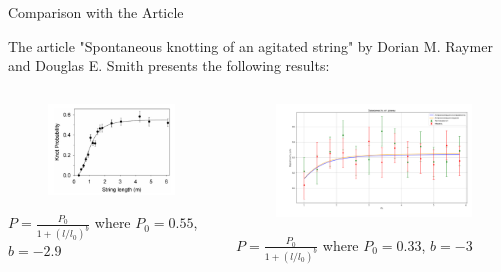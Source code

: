 \begin{frame}{Comparison with the Article}
\begin{block}{}
The article "Spontaneous knotting of an agitated string" by Dorian M. Raymer and Douglas E. Smith presents the following results:
\end{block}

\begin{columns}
\begin{column}{0.4\linewidth}
\begin{figure}[H]
\includegraphics[width=1\linewidth]{img/knot_prob.png}
\end{figure}
$P = \frac{P_0}{1+(l/l_0)^b}$
where $P_0 = 0.55$, $b = -2.9$
\end{column}

\begin{column}{0.6\linewidth}
\begin{figure}[H]
\includegraphics[width=1\linewidth]{img/both_7_er.png}
\end{figure}
$P = \frac{P_0}{1+(l/l_0)^b}$
where $P_0 = 0.33$, $b = -3$
\end{column}
\end{columns}
\end{frame}

